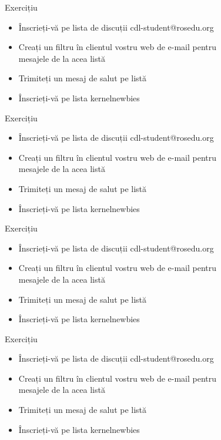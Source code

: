 \documentclass{beamer}
\begin{document}
    \begin{frame}{Exercițiu}
    \begin{itemize}
    \setlength{\itemsep}{0.5cm}
    \item Înscrieți-vă pe lista de discuții cdl-student@rosedu.org
    \item Creați un filtru în clientul vostru web de e-mail pentru \\
        mesajele de la acea listă
    \item Trimiteți un mesaj de salut pe listă
    \item Înscrieți-vă pe lista kernelnewbies
    \end{itemize}
    \end{frame}
    \begin{frame}{Exercițiu}
    \begin{itemize}
    \setlength{\itemsep}{0.5cm}
    \item Înscrieți-vă pe lista de discuții cdl-student@rosedu.org
    \item Creați un filtru în clientul vostru web de e-mail pentru \\
        mesajele de la acea listă
    \item Trimiteți un mesaj de salut pe listă
    \item Înscrieți-vă pe lista kernelnewbies
    \end{itemize}
    \end{frame}
    \begin{frame}{Exercițiu}
    \begin{itemize}
    \setlength{\itemsep}{0.5cm}
    \item Înscrieți-vă pe lista de discuții cdl-student@rosedu.org
    \item Creați un filtru în clientul vostru web de e-mail pentru \\
        mesajele de la acea listă
    \item Trimiteți un mesaj de salut pe listă
    \item Înscrieți-vă pe lista kernelnewbies
    \end{itemize}
    \end{frame}
    \begin{frame}{Exercițiu}
    \begin{itemize}
    \setlength{\itemsep}{0.5cm}
    \item Înscrieți-vă pe lista de discuții cdl-student@rosedu.org
    \item Creați un filtru în clientul vostru web de e-mail pentru \\
        mesajele de la acea listă
    \item Trimiteți un mesaj de salut pe listă
    \item Înscrieți-vă pe lista kernelnewbies
    \end{itemize}
    \end{frame}
\end{document}
